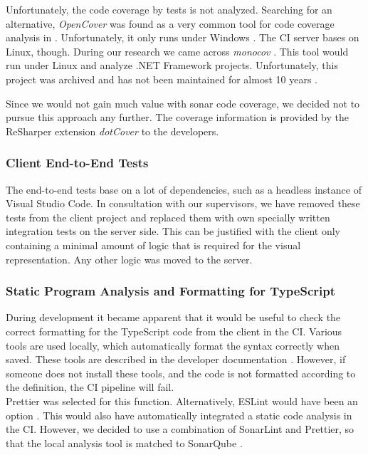 {{Unfortunately, the code coverage by tests is not analyzed.
Searching for an alternative, \textit{OpenCover} was found as a very common tool for code coverage analysis in \Csharp.
Unfortunately, it only runs under Windows  \cite{opencover}.
The CI server bases on Linux, though.
During our research we came across \textit{monocov} \cite{monocov}.
This tool would run under Linux and analyze .NET Framework projects.
Unfortunately, this project was archived and has not been maintained for almost 10 years \cite{monocov}.

Since we would not gain much value with sonar code coverage, we decided not to pursue this approach any further.
The coverage information is provided by the ReSharper extension \textit{dotCover} \cite{dotcover} to the developers.

\subsubsection{Client End-to-End Tests}
The end-to-end tests base on a lot of dependencies, such as a headless instance of Visual Studio Code.
In consultation with our supervisors, we have removed these tests from the client project and replaced them with own specially written integration tests on the server side.
This can be justified with the client only containing a minimal amount of logic that is required for the visual representation.
Any other logic was moved to the server.

\subsubsection{Static Program Analysis and Formatting for TypeScript}
During development it became apparent that it would be useful to check the correct formatting
for the TypeScript code from the client in the CI.
Various tools are used locally, which automatically format the syntax correctly when saved.
These tools are described in the developer documentation \cite{dev}.
However, if someone does not install these tools,
and the code is not formatted according to the definition,
the CI pipeline will fail. \\

Prettier was selected for this function.
Alternatively, ESLint would have been an option \cite{eslint}.
This would also have automatically integrated a static code analysis in the CI.
However, we decided to use a combination of SonarLint and Prettier,
so that the local analysis tool is matched to SonarQube \cite{dev}.

}}
